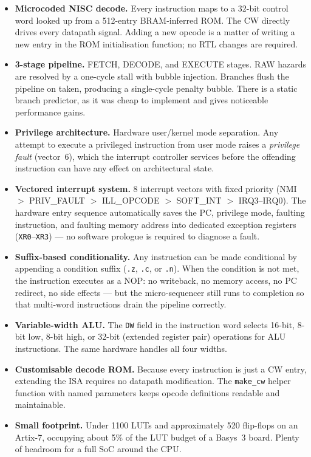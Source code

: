\documentclass[a4paper,12pt]{report}
\newcommand{\asm}[1]{\texttt{#1}}
\newcommand{\field}[1]{\texttt{\small #1}}
\begin{document}
\begin{itemize}
    \item \textbf{Microcoded NISC decode.}
          Every instruction maps to a 32-bit control word looked up from a 512-entry BRAM-inferred ROM. The CW directly drives every datapath signal. Adding a new opcode is a matter of writing a new entry in the ROM initialisation function; no RTL changes are required.

    \item \textbf{3-stage pipeline.}
          FETCH, DECODE, and EXECUTE stages. RAW hazards are resolved by a one-cycle stall with bubble injection. Branches flush the pipeline on taken, producing a single-cycle penalty bubble. There is a static branch predictor, as it was cheap to implement and gives noticeable performance gains.

    \item \textbf{Privilege architecture.}
          Hardware user/kernel mode separation. Any attempt to execute a privileged instruction from user mode raises a \emph{privilege fault} (vector~6), which the interrupt controller services before the offending instruction can have any effect on architectural state.

    \item \textbf{Vectored interrupt system.}
          8 interrupt vectors with fixed priority (NMI $>$ PRIV\_FAULT $>$ ILL\_OPCODE $>$ SOFT\_INT $>$ IRQ3--IRQ0). The hardware entry sequence automatically saves the PC, privilege mode, faulting instruction, and faulting memory address into dedicated exception registers (\asm{XR0}--\asm{XR3}) --- no software prologue is required to diagnose a fault.

    \item \textbf{Suffix-based conditionality.}
          Any instruction can be made conditional by appending a condition suffix (\asm{.z}, \asm{.c}, or \asm{.n}). When the condition is not met, the instruction executes as a NOP: no writeback, no memory access, no PC redirect, no side effects --- but the micro-sequencer still runs to completion so that multi-word instructions drain the pipeline correctly.

    \item \textbf{Variable-width ALU.}
          The \field{DW} field in the instruction word selects 16-bit, 8-bit low, 8-bit high, or 32-bit (extended register pair) operations for ALU instructions. The same hardware handles all four widths.

    \item \textbf{Customisable decode ROM.}
          Because every instruction is just a CW entry, extending the ISA requires no datapath modification. The \asm{make\_cw} helper function with named parameters keeps opcode definitions readable and maintainable.

    \item \textbf{Small footprint.}
          Under 1100 LUTs and approximately 520 flip-flops on an Artix-7, occupying about 5\% of the LUT budget of a Basys~3 board. Plenty of headroom for a full SoC around the CPU.
\end{itemize}
\end{document}
